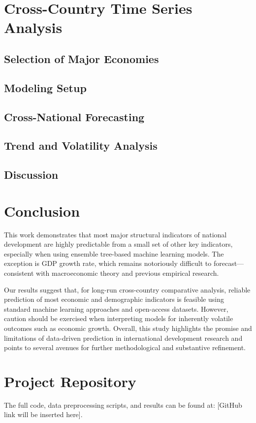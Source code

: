 \documentclass[12pt]{article}
\begin{document}
\section{Cross-Country Time Series Analysis}

\subsection{Selection of Major Economies}

\subsection{Modeling Setup}

\subsection{Cross-National Forecasting}

\subsection{Trend and Volatility Analysis}

\subsection{Discussion}

\section{Conclusion}

This work demonstrates that most major structural indicators of national development are highly predictable from a small set of other key indicators, especially when using ensemble tree-based machine learning models. The exception is GDP growth rate, which remains notoriously difficult to forecast—consistent with macroeconomic theory and previous empirical research.

Our results suggest that, for long-run cross-country comparative analysis, reliable prediction of most economic and demographic indicators is feasible using standard machine learning approaches and open-access datasets. However, caution should be exercised when interpreting models for inherently volatile outcomes such as economic growth. Overall, this study highlights the promise and limitations of data-driven prediction in international development research and points to several avenues for further methodological and substantive refinement.


\section*{Project Repository}
The full code, data preprocessing scripts, and results can be found at: [GitHub link will be inserted here].





\end{document}
